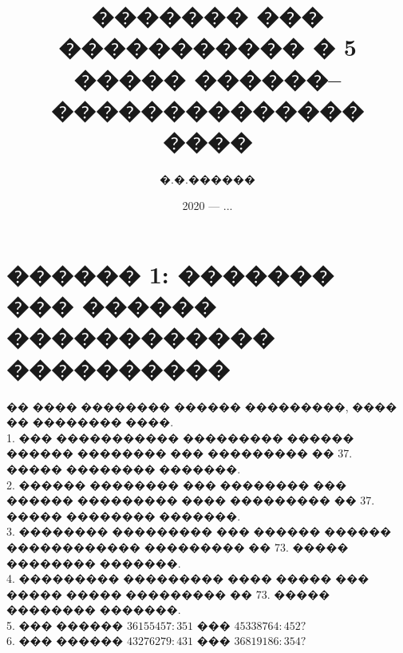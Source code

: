 \documentclass[12pt]{article}
\author{�.�.\;������}
\title{������� ��� ����������� � 5 ����� ������--�������������� ����}
\date{2020 --- ...}
\begin{document}
\newpage
\tableofcontents
\newpage
\section{������ 1: ������� ��� ������ ������������ ����������}
�� ���� �������� ������ ���������, ���� �� �������� ����.\\
1. ��� ����������� ��������� ������ ������ �������� ��� ��������� �� 37. ����� �������� �������.\\
2. ������ �������� ��� �������� ��� ������ ��������� ���� ��������� �� 37. ����� �������� �������.\\
3. �������� ��������� ��� ������ ������ ������������ ��������� �� 73. ����� �������� �������.\\
4. ��������� ��������� ���� ����� ��� ����� ����� ��������� �� 73. ����� �������� �������.\\
5. ��� ������ $36155457:351$ ��� $45338764:452?$\\
6. ��� ������ $43276279:431$ ��� $36819186:354?$\\
\end{document}
